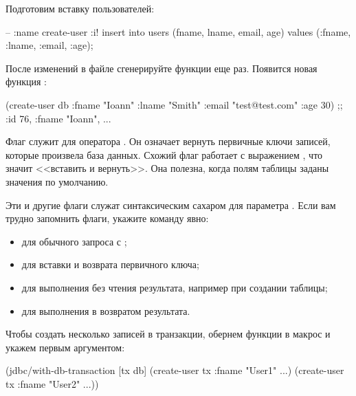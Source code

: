 Подготовим вставку пользователей:

\begin{english}
  \begin{sql}
-- :name create-user :i!
insert into users (fname, lname, email, age)
values (:fname, :lname, :email, :age);
  \end{sql}
\end{english}

После изменений в файле сгенерируйте функции еще раз. Появится новая функция :

\begin{english}
  \begin{clojure}
(create-user db {:fname "Ioann"
                 :lname "Smith"
                 :email "test@test.com"
                 :age 30})
;; {:id 76, :fname "Ioann", ...}
  \end{clojure}
\end{english}

Флаг  служит для оператора . Он означает вернуть первичные ключи записей, которые произвела база данных. Схожий флаг \code{:<!} работает с выражением , что значит <<вставить и вернуть>>. Она полезна, когда полям таблицы заданы значения по умолчанию.

Эти и другие флаги служат синтаксическим сахаром для параметра . Если вам трудно запомнить флаги, укажите команду явно:

\begin{itemize}

\item
   для обычного запроса с ;

\item
   для вставки и возврата первичного ключа;

\item
   для выполнения без чтения результата, например при создании таблицы;

\item
   для выполнения в возвратом результата.

\end{itemize}

Чтобы создать несколько записей в транзакции, обернем функции в макрос  и укажем  первым аргументом:

\begin{english}
  \begin{clojure}
(jdbc/with-db-transaction [tx db]
  (create-user tx {:fname "User1" ...})
  (create-user tx {:fname "User2" ...}))
  \end{clojure}
\end{english}

